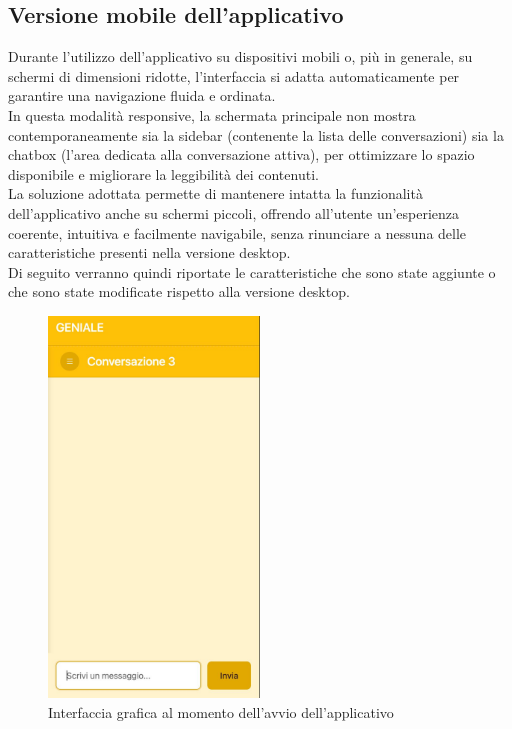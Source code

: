 \subsection{Versione mobile dell'applicativo}
Durante l’utilizzo dell’applicativo su dispositivi mobili o, più in generale, su schermi di dimensioni ridotte, l’interfaccia si adatta automaticamente per garantire una navigazione fluida e ordinata. \\
In questa modalità responsive, la schermata principale non mostra contemporaneamente sia la sidebar (contenente la lista delle conversazioni) sia la chatbox (l’area dedicata alla conversazione attiva), per ottimizzare lo spazio disponibile e migliorare la leggibilità dei contenuti. \\
La soluzione adottata permette di mantenere intatta la funzionalità dell’applicativo anche su schermi piccoli, offrendo all’utente un’esperienza coerente, intuitiva e facilmente navigabile, senza rinunciare a nessuna delle caratteristiche presenti nella versione desktop.\\
Di seguito verranno quindi riportate le caratteristiche che sono state aggiunte o che sono state modificate rispetto alla versione desktop.
\begin{figure}[H]
\centering
\includegraphics[width=0.5\textwidth]{contents/img/active_conv_mobile.jpg}
\caption{Interfaccia grafica al momento dell’avvio dell’applicativo}
\end{figure}

